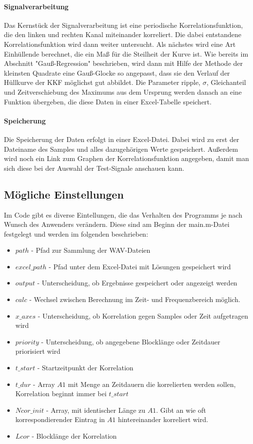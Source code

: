 \paragraph{Signalverarbeitung}
Das Kernstück der Signalverarbeitung ist eine periodische Korrelationsfunktion, die den linken und rechten Kanal miteinander korreliert. Die dabei entstandene Korrelationsfunktion wird dann weiter untersucht. Als nächstes wird eine Art Einhüllende berechnet, die ein Maß für die Steilheit der Kurve ist. Wie bereits im Abschnitt "Gauß-Regression" beschrieben, wird dann mit Hilfe der Methode der kleinsten Quadrate eine Gauß-Glocke so angepasst, dass sie den Verlauf der Hüllkurve der KKF möglichst gut abbildet. Die Parameter ripple, $\sigma$, Gleichanteil und Zeitverschiebung des Maximums aus dem Ursprung werden danach an eine Funktion übergeben, die diese Daten in einer Excel-Tabelle speichert.
\paragraph{Speicherung}
Die Speicherung der Daten erfolgt in einer Excel-Datei. Dabei wird zu erst der Dateiname des Samples und alles dazugehörigen Werte gespeichert. Außerdem wird noch ein Link zum Graphen der Korrelationsfunktion angegeben, damit man sich diese bei der Auswahl der Test-Signale anschauen kann.
\subsection{Mögliche Einstellungen}
Im Code gibt es diverse Eintellungen, die das Verhalten des Programms je nach Wunsch des Anwenders verändern. Diese sind am Beginn der main.m-Datei festgelegt und werden im folgenden beschrieben:
\begin{itemize} 
\item $path$ - Pfad zur Sammlung der WAV-Dateien
\item $excel\_path$ - Pfad unter dem Excel-Datei mit Lösungen gespeichert wird
\item $output$ - Unterscheidung, ob Ergebnisse gespeichert oder angezeigt werden
\item $calc$ - Wechsel zwischen Berechnung im Zeit- und Frequenzbereich möglich.
\item $x\_axes$ - Unterscheidung, ob Korrelation gegen Samples oder Zeit aufgetragen wird
\item $priority$ - Unterscheidung, ob angegebene Blocklänge oder Zeitdauer priorisiert wird
\item $t\_start$ - Startzeitpunkt der Korrelation
\item $t\_dur$ - Array $A1$ mit Menge an Zeitdauern die korrelierten werden sollen, Korrelation beginnt immer bei $t\_start$
\item $Ncor\_init$ - Array, mit identischer Länge zu $A1$. Gibt an wie oft korrespondierender Eintrag in $A1$ hintereinander korreliert wird. 
\item $Lcor$ - Blocklänge der Korrelation
\end{itemize}

